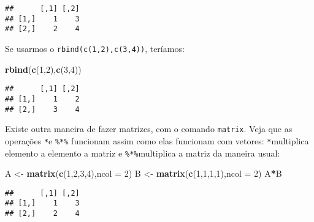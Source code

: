 \documentclass[]{book}
\newenvironment{Shaded}{\begin{snugshade}}{\end{snugshade}}
\newcommand{\KeywordTok}[1]{\textcolor[rgb]{0.13,0.29,0.53}{\textbf{#1}}}
\newcommand{\DataTypeTok}[1]{\textcolor[rgb]{0.13,0.29,0.53}{#1}}
\newcommand{\DecValTok}[1]{\textcolor[rgb]{0.00,0.00,0.81}{#1}}
\newcommand{\StringTok}[1]{\textcolor[rgb]{0.31,0.60,0.02}{#1}}
\newcommand{\OperatorTok}[1]{\textcolor[rgb]{0.81,0.36,0.00}{\textbf{#1}}}
\newcommand{\NormalTok}[1]{#1}
\begin{document}
\begin{verbatim}
##      [,1] [,2]
## [1,]    1    3
## [2,]    2    4
\end{verbatim}

Se usarmos o \texttt{rbind(c(1,2),c(3,4))}, teríamos:

\begin{Shaded}
\begin{Highlighting}[]
\KeywordTok{rbind}\NormalTok{(}\KeywordTok{c}\NormalTok{(}\DecValTok{1}\NormalTok{,}\DecValTok{2}\NormalTok{),}\KeywordTok{c}\NormalTok{(}\DecValTok{3}\NormalTok{,}\DecValTok{4}\NormalTok{))}
\end{Highlighting}
\end{Shaded}

\begin{verbatim}
##      [,1] [,2]
## [1,]    1    2
## [2,]    3    4
\end{verbatim}

Existe outra maneira de fazer matrizes, com o comando \texttt{matrix}.
Veja que as operações \texttt{*}e \texttt{\%*\%} funcionam assim como
elas funcionam com vetores: \texttt{*}multiplica elemento a elemento a
matriz e \texttt{\%*\%}multiplica a matriz da maneira usual:

\begin{Shaded}
\begin{Highlighting}[]
\NormalTok{A <-}\StringTok{ }\KeywordTok{matrix}\NormalTok{(}\KeywordTok{c}\NormalTok{(}\DecValTok{1}\NormalTok{,}\DecValTok{2}\NormalTok{,}\DecValTok{3}\NormalTok{,}\DecValTok{4}\NormalTok{),}\DataTypeTok{ncol =} \DecValTok{2}\NormalTok{)}
\NormalTok{B <-}\StringTok{ }\KeywordTok{matrix}\NormalTok{(}\KeywordTok{c}\NormalTok{(}\DecValTok{1}\NormalTok{,}\DecValTok{1}\NormalTok{,}\DecValTok{1}\NormalTok{,}\DecValTok{1}\NormalTok{),}\DataTypeTok{ncol =} \DecValTok{2}\NormalTok{)}
\NormalTok{A}\OperatorTok{*}\NormalTok{B}
\end{Highlighting}
\end{Shaded}

\begin{verbatim}
##      [,1] [,2]
## [1,]    1    3
## [2,]    2    4
\end{verbatim}

\begin{Shaded}
\end{Shaded}
\end{document}
